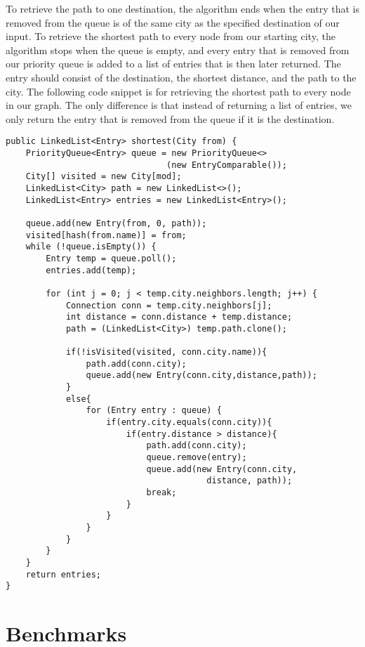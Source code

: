 \documentclass[a4paper,11pt]{article}
\begin{document}
        To retrieve the path to one destination, the algorithm ends when the entry that is removed from the queue is of the same city as the specified destination of our input. To retrieve the shortest path to every node from our starting city, the algorithm stops when the queue is empty, and every entry that is removed from our priority queue is added to a list of entries that is then later returned. The entry should consist of the destination, the shortest distance, and the path to the city. The following code snippet is for retrieving the shortest path to every node in our graph. The only difference is that instead of returning a list of entries, we only return the entry that is removed from the queue if it is the destination.
\begin{verbatim}
public LinkedList<Entry> shortest(City from) {
    PriorityQueue<Entry> queue = new PriorityQueue<>
                                (new EntryComparable());
    City[] visited = new City[mod];
    LinkedList<City> path = new LinkedList<>();
    LinkedList<Entry> entries = new LinkedList<Entry>();
    
    queue.add(new Entry(from, 0, path));
    visited[hash(from.name)] = from;
    while (!queue.isEmpty()) {
        Entry temp = queue.poll();
        entries.add(temp);
        
        for (int j = 0; j < temp.city.neighbors.length; j++) {
            Connection conn = temp.city.neighbors[j];
            int distance = conn.distance + temp.distance;
            path = (LinkedList<City>) temp.path.clone();
            
            if(!isVisited(visited, conn.city.name)){
                path.add(conn.city);
                queue.add(new Entry(conn.city,distance,path));
            }
            else{
                for (Entry entry : queue) {
                    if(entry.city.equals(conn.city)){
                        if(entry.distance > distance){
                            path.add(conn.city);
                            queue.remove(entry);
                            queue.add(new Entry(conn.city, 
                                        distance, path));
                            break;
                        }
                    }
                }
            }
        }
    }
    return entries;
}
\end{verbatim}
        
\section*{Benchmarks}
\end{document}

